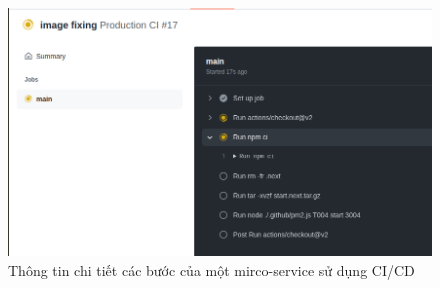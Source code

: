 \begin{figure}[h!]
	\begin{center}	
		\includegraphics[width=\textwidth]{./results/production}
		\caption{Thông tin chi tiết các bước của một mirco-service sử dụng CI/CD}
	\end{center}
\end{figure}


